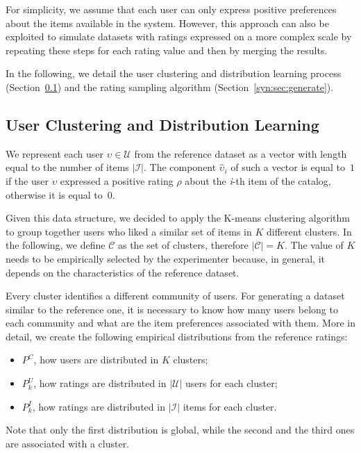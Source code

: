 For simplicity, we assume that each user can only express positive preferences about the items available in the system. However, this approach can also be exploited to simulate datasets with ratings expressed on a more complex scale by repeating these steps for each rating value and then by merging the results.

In the following, we detail the user clustering and distribution learning process (Section~\ref{syn:sec:clustering}) and the rating sampling algorithm (Section~\ref{syn:sec:generate}).

\subsection{User Clustering and Distribution Learning}
\label{syn:sec:clustering}

We represent each user $\upsilon \in \mathcal{U}$ from the reference dataset as a vector with length equal to the number of items $|\mathcal{I}|$. The component $\hat{\upsilon}_i$ of such a vector is equal to~$1$ if the user $\upsilon$ expressed a positive rating $\rho$ about the \textit{i}-th item of the catalog, otherwise it is equal to~$0$.

Given this data structure, we decided to apply the K-means clustering algorithm~\cite{Hartigan1979} to group together users who liked a similar set of items in $K$ different clusters. In the following, we define $\mathcal{C}$ as the set of clusters, therefore $|\mathcal{C}| = K$. The value of $K$ needs to be empirically selected by the experimenter because, in general, it depends on the characteristics of the reference dataset.

Every cluster identifies a different community of users. For generating a dataset similar to the reference one, it is necessary to know how many users belong to each community and what are the item preferences associated with them. More in detail, we create the following empirical distributions from the reference ratings:

\begin{itemize}
\item $P^C$, how users are distributed in $K$ clusters;
\item $P^U_k$, how ratings are distributed in $|\mathcal{U}|$ users for each cluster;
\item $P^I_k$, how ratings are distributed in $|\mathcal{I}|$ items for each cluster.
\end{itemize}

Note that only the first distribution is global, while the second and the third ones are associated with a cluster.%

